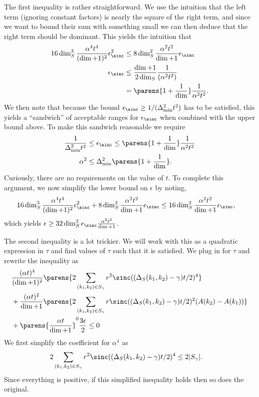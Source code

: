     The first inequality is rather straightforward. We use the intuition that the left term (ignoring constant factors) is nearly the square of the right term, and since we want to bound their sum with something small we can then deduce that the right term should be dominant. This yields the intuition that
    \begin{align}
        16 \dim_S^3 \frac{\alpha^4 t^4}{(\dim + 1)^2} \epsilon_{\sinc}^2 &\leq 8 \dim_S^2 \frac{\alpha^2 t^2}{\dim + 1} \epsilon_{\sinc} \\
        \epsilon_{\sinc} &\leq \frac{\dim + 1}{2 \dim_S} \frac{1}{(\alpha^2 t^2)} \\
        &= \parens{1 + \frac{1}{\dim}} \frac{1}{\alpha^2 t^2}.
    \end{align}
    We then note that because the bound $\epsilon_{\sinc} \geq 1/(\Delta_{\min}^2 t^2)$ has to be satisfied, this yields a ``sandwich'' of acceptable ranges for $\epsilon_{\sinc}$ when combined with the upper bound above. To make this sandwich reasonable we require
    \begin{align}
        \frac{1}{\Delta_{\min}^2 t^2} &\leq \epsilon_{\sinc} \leq \parens{1 + \frac{1}{\dim}} \frac{1}{\alpha^2 t^2} \\
        \alpha^2 &\leq \Delta_{\min}^2 \parens{1 + \frac{1}{\dim}}.
    \end{align}
    Curiously, there are no requirements on the value of $t$. To complete this argument, we now simplify the lower bound on $\epsilon$ by noting,
    \begin{align}
        16 \dim_S^3 \frac{\alpha^4 t^4}{(\dim + 1)^2} \epsilon_{\sinc}^2 + 8 \dim_S^2 \frac{\alpha^2 t^2}{\dim + 1}\epsilon_{\sinc} &\leq 16 \dim_S^2 \frac{\alpha^2 t^2}{\dim + 1}\epsilon_{\sinc},
    \end{align}
    which yields $\epsilon \geq 32 \dim_S^2 \epsilon_{\sinc} \frac{\alpha^2 t^2}{\dim + 1}$.
    
    The second inequality is a lot trickier. We will work with this as a quadratic expression in $\tau$ and find values of $\tau$ such that it is satisfied. We plug in for $\tau$ and rewrite the inequality as 
    \begin{align}
        &\frac{(\alpha t)^4}{(\dim + 1)^2} \parens{2  \sum_{(k_1, k_2) \in S_{\gamma}} r^2 \sinc((\Delta_S(k_1, k_2) - \gamma) t/2)^4} \nonumber \\
        &+ \frac{(\alpha t)^2}{\dim + 1} \parens{2  \sum_{(k_1, k_2) \in S_{\gamma}}r \sinc((\Delta_S(k_1, k_2) - \gamma) t/2)^2 (A(k_2) - A(k_1))} \nonumber \\
        &+ \parens{\frac{\alpha t}{\dim + 1}}^0 \frac{3 \epsilon}{2} \leq 0
    \end{align}
    We first simplify the coefficient for $\alpha^4$ as 
    \begin{align}
        2 \sum_{(k_1, k_2) \in S_{\gamma}} r^2 \sinc((\Delta_S(k_1, k_2) - \gamma) t/2)^4 &\leq 2 |S_{\gamma}|.
    \end{align}
    Since everything is positive, if this simplified inequality holds then so does the original. 
    
